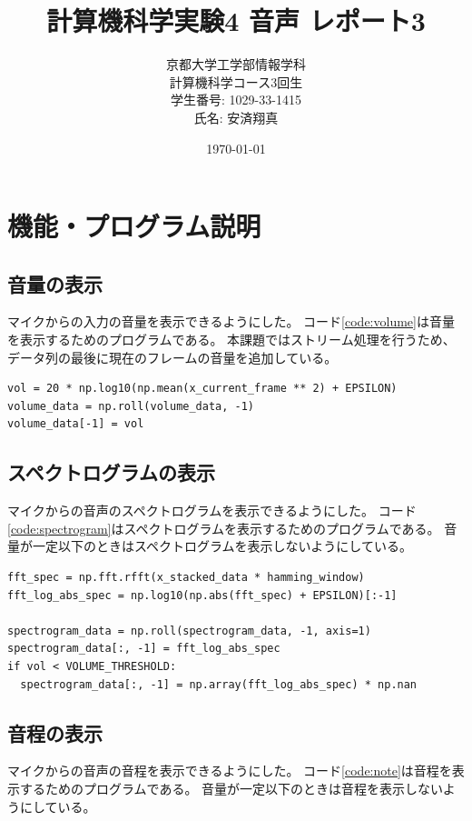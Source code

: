 \documentclass[a4paper,11pt]{jsarticle}
\begin{document}
\title{計算機科学実験4 音声 レポート3}
\author{
  京都大学工学部情報学科\\
  計算機科学コース3回生\\
  学生番号: 1029-33-1415\\
  氏名: 安済翔真
}
\date{\today}
\maketitle

\tableofcontents
\newpage

\section{機能・プログラム説明}
\subsection{音量の表示}
マイクからの入力の音量を表示できるようにした。
コード\ref{code:volume}は音量を表示するためのプログラムである。
本課題ではストリーム処理を行うため、データ列の最後に現在のフレームの音量を追加している。

\begin{lstlisting}[caption=音量の表示,label=code:volume]
vol = 20 * np.log10(np.mean(x_current_frame ** 2) + EPSILON)
volume_data = np.roll(volume_data, -1)
volume_data[-1] = vol
\end{lstlisting}

\subsection{スペクトログラムの表示}
マイクからの音声のスペクトログラムを表示できるようにした。
コード\ref{code:spectrogram}はスペクトログラムを表示するためのプログラムである。
音量が一定以下のときはスペクトログラムを表示しないようにしている。

\begin{lstlisting}[caption=スペクトログラムの表示,label=code:spectrogram]
fft_spec = np.fft.rfft(x_stacked_data * hamming_window)
fft_log_abs_spec = np.log10(np.abs(fft_spec) + EPSILON)[:-1]

spectrogram_data = np.roll(spectrogram_data, -1, axis=1)
spectrogram_data[:, -1] = fft_log_abs_spec
if vol < VOLUME_THRESHOLD:
  spectrogram_data[:, -1] = np.array(fft_log_abs_spec) * np.nan
\end{lstlisting}

\subsection{音程の表示}
マイクからの音声の音程を表示できるようにした。
コード\ref{code:note}は音程を表示するためのプログラムである。
音量が一定以下のときは音程を表示しないようにしている。
\end{document}
